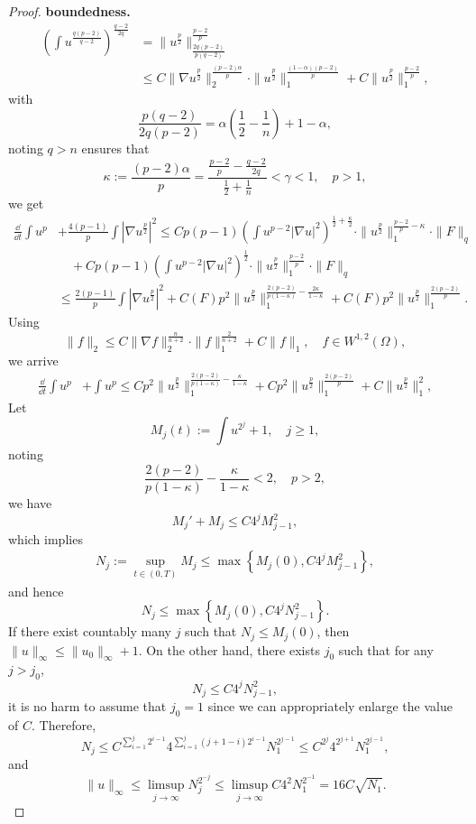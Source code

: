 \begin{proof}
	\textbf{boundedness.}
	\begin{align*}
		\left(\int u^{\frac{q(p-2)}{q-2}}\right)^{\frac{q-2}{2q}}
		&= \|u^{\frac{p}{2}}\|_{\frac{2q(p-2)}{p(q-2)}}^{\frac{p-2}{p}}\\
		&\leq C\|\nabla u^{\frac{p}{2}}\|_2^{\frac{(p-2)\alpha}{p}}\cdot\|u^{\frac{p}{2}}\|_1^{\frac{(1-\alpha)(p-2)}{p}} + C\|u^{\frac{p}{2}}\|_1^{\frac{p-2}{p}},
	\end{align*}
	with 
	\[
		\frac{p(q-2)}{2q(p-2)} = \alpha\left(\frac12-\frac1n\right) + 1-\alpha,
	\]
	noting $q>n$ ensures that
	\[
		\kappa := \frac{(p-2)\alpha}{p} = \frac{\frac{p-2}{p}-\frac{q-2}{2q}}{\frac12+\frac1n} <\gamma < 1,
		\quad p > 1,
	\]
	we get
	\begin{align*}
		\frac{\dd}{\dd t}\int u^p &+ \frac{4(p-1)}{p}\int |\nabla u^{\frac{p}{2}}|^2
		\leq Cp(p-1)\left(\int u^{p-2}|\nabla u|^2\right)^{\frac12+\frac\kappa2}\cdot\|u^{\frac{p}{2}}\|_1^{\frac{p-2}{p} - \kappa}\cdot\|F\|_q \\
		&\quad +Cp(p-1) \left(\int u^{p-2}|\nabla u|^2\right)^{\frac12}\cdot\|u^{\frac{p}{2}}\|_1^{\frac{p-2}{p}}\cdot\|F\|_q \\
		&\leq \frac{2(p-1)}{p}\int |\nabla u^{\frac{p}{2}}|^2 
			+ C(F)p^2\|u^{\frac{p}{2}}\|_1^{\frac{2(p-2)}{p(1-\kappa)}-\frac{2\kappa}{1-\kappa}}
			+ C(F)p^2\|u^{\frac{p}{2}}\|_1^{\frac{2(p-2)}{p}}.
	\end{align*}
	Using 
	\[
		\|f\|_2\leq C\|\nabla f\|_2^{\frac{n}{n+2}}\cdot\|f\|_1^{\frac{2}{n+2}} + C\|f\|_1,\quad f\in W^{1,2}(\Omega),
	\]
	we arrive 
	\begin{align*}
		\frac{\dd}{\dd t}\int u^p &+ \int  u^{p}
			\leq Cp^2 \|u^{\frac{p}{2}}\|_1^{\frac{2(p-2)}{p(1-\kappa)}-\frac{\kappa}{1-\kappa}}
				+ Cp^2\|u^{\frac{p}{2}}\|_1^{\frac{2(p-2)}{p}}
				+ C\|u^{\frac{p}{2}}\|_1^2,
	\end{align*}
	Let
	\[
		M_j(t) := \int u^{2^j} + 1, \quad j\geq1,
	\]
	noting 
	\[
		\frac{2(p-2)}{p(1-\kappa)}-\frac{\kappa}{1-\kappa} < 2,\quad p>2,
	\]
	we have 
	\[
		M_j' + M_j \leq C4^jM_{j-1}^2,
	\]
	which implies 
	\begin{align*}
		N_j := \sup_{t\in(0,T)}M_j \leq \max\left\{ M_j(0), C4^jM_{j-1}^2\right\},
	\end{align*}
	and hence
	\[
		N_j \leq \max\left\{ M_j(0), C4^jN_{j-1}^2\right\}.
	\]
	If there exist countably many $j$ such that $N_j \leq M_j(0)$, 
	then $\|u\|_\infty \leq \|u_0\|_\infty + 1$.
	On the other hand, there exists $j_0$ such that for any $j>j_0$, 
	\[
		N_j \leq C4^jN_{j-1}^2,
	\]
	it is no harm to assume that $j_0=1$ since we can appropriately enlarge the value of $C$.
	Therefore,
	\[
		N_j\leq C^{\sum_{i=1}^j2^{i-1}}4^{\sum_{i=1}^{j}(j+1-i)2^{i-1}}N_1^{2^{j-1}}
			\leq C^{2^j}4^{2^{j+1}}N_1^{2^{j-1}},
	\]
	and 
	\[
		\|u\|_\infty\leq\limsup_{j\to\infty}N_j^{2^{-j}}
			\leq\limsup_{j\to\infty}C4^2N_1^{2^{-1}}=16C\sqrt{N_1}.
	\]
\end{proof}

